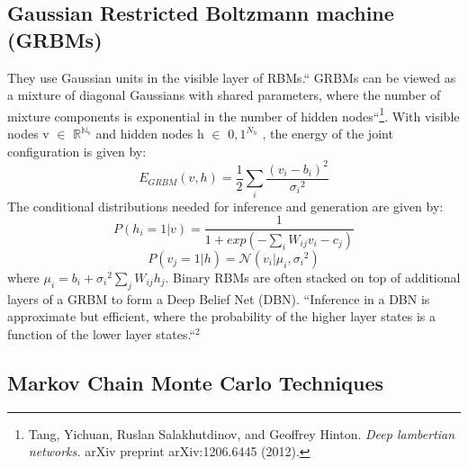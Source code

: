 \documentclass{article}
\begin{document}
\subsection{Gaussian Restricted Boltzmann machine (GRBMs)}
They use Gaussian units in the visible layer of RBMs.`` GRBMs can be viewed as a mixture of diagonal Gaussians with shared parameters, where the number of mixture components is exponential in the number of hidden nodes``\footnote{Tang, Yichuan, Ruslan Salakhutdinov, and Geoffrey Hinton. \textit{Deep lambertian networks.} arXiv preprint arXiv:1206.6445 (2012).}. With visible nodes v $\in$ $\mathbb{R^{N_v}}$ and hidden nodes h $\in$ ${0, 1}^{N_h}$ , the energy of the joint configuration is given by:
\begin{equation}
E_{GRBM} (v,h) = \frac{1}{2}\sum_i \frac{(v_i-b_i)^2}{{\sigma_i}^2}
\end{equation}
The conditional distributions needed for inference and generation are given by:
\begin{equation}
P(h_i=1|v) = \frac{1}{1+exp(-\sum_i W_{ij}v_i - c_j)}
\end{equation}
\begin{equation}
P(v_j=1|h) = \mathcal{N}(v_i| \mu_i,{\sigma_i}^2) 
\end{equation}
\hspace{1cm} where $\mu_i = b_i + {\sigma_i}^2 \sum_j W_{ij}h_j$. Binary RBMs are often stacked on top of additional layers of a GRBM to form a Deep Belief Net (DBN)\cite{dbn}. ``Inference in a DBN is approximate but efficient, where the probability of the higher layer states is a function of the lower layer states.``$^{2}$

\subsection{Markov Chain Monte Carlo Techniques}
\end{document}
